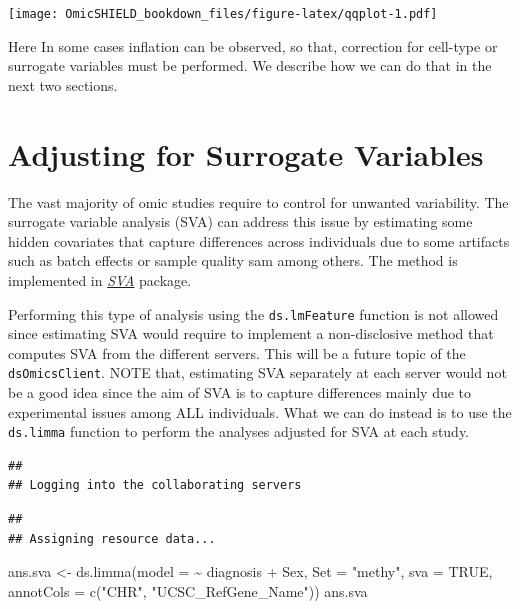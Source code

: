 \documentclass[
]{book}
\newenvironment{Shaded}{\begin{snugshade}}{\end{snugshade}}
\newcommand{\AttributeTok}[1]{\textcolor[rgb]{0.77,0.63,0.00}{#1}}
\newcommand{\ConstantTok}[1]{\textcolor[rgb]{0.00,0.00,0.00}{#1}}
\newcommand{\FunctionTok}[1]{\textcolor[rgb]{0.00,0.00,0.00}{#1}}
\newcommand{\NormalTok}[1]{#1}
\newcommand{\OtherTok}[1]{\textcolor[rgb]{0.56,0.35,0.01}{#1}}
\newcommand{\SpecialCharTok}[1]{\textcolor[rgb]{0.00,0.00,0.00}{#1}}
\newcommand{\StringTok}[1]{\textcolor[rgb]{0.31,0.60,0.02}{#1}}
\begin{document}
\texttt{[image: OmicSHIELD\_bookdown\_files/figure-latex/qqplot-1.pdf]}

Here In some cases inflation can be observed, so that, correction for cell-type or surrogate variables must be performed. We describe how we can do that in the next two sections.

\hypertarget{adjusting-for-surrogate-variables}{%
\section{Adjusting for Surrogate Variables}\label{adjusting-for-surrogate-variables}}

The vast majority of omic studies require to control for unwanted variability. The surrogate variable analysis (SVA) can address this issue by estimating some hidden covariates that capture differences across individuals due to some artifacts such as batch effects or sample quality sam among others. The method is implemented in \emph{\href{https://bioconductor.org/packages/3.12/SVA}{SVA}} package.

Performing this type of analysis using the \texttt{ds.lmFeature} function is not allowed since estimating SVA would require to implement a non-disclosive method that computes SVA from the different servers. This will be a future topic of the \texttt{dsOmicsClient}. NOTE that, estimating SVA separately at each server would not be a good idea since the aim of SVA is to capture differences mainly due to experimental issues among ALL individuals. What we can do instead is to use the \texttt{ds.limma} function to perform the analyses adjusted for SVA at each study.

\begin{verbatim}
## 
## Logging into the collaborating servers
\end{verbatim}

\begin{verbatim}
## 
## Assigning resource data...
\end{verbatim}

\begin{Shaded}
\begin{Highlighting}[]
\NormalTok{ans.sva }\OtherTok{\textless{}{-}} \FunctionTok{ds.limma}\NormalTok{(}\AttributeTok{model =} \SpecialCharTok{\textasciitilde{}}\NormalTok{ diagnosis }\SpecialCharTok{+}\NormalTok{ Sex, }
                    \AttributeTok{Set =} \StringTok{"methy"}\NormalTok{,}
                    \AttributeTok{sva =} \ConstantTok{TRUE}\NormalTok{, }\AttributeTok{annotCols =} \FunctionTok{c}\NormalTok{(}\StringTok{"CHR"}\NormalTok{, }\StringTok{"UCSC\_RefGene\_Name"}\NormalTok{))}
\NormalTok{ans.sva}
\end{Highlighting}
\end{Shaded}
\end{document}
